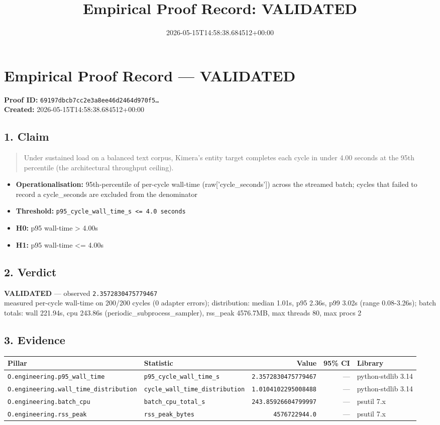 \documentclass{article}
\title{Empirical Proof Record: VALIDATED}
\date{2026-05-15T14:58:38.684512+00:00}
\begin{document}
\maketitle
\section*{Empirical Proof Record --- \textcolor{validated}{\textbf{VALIDATED}}}
\textbf{Proof ID:} \texttt{69197dbcb7cc2e3a8ee46d2464d970f5\dots}\\
\textbf{Created:} 2026-05-15T14:58:38.684512+00:00
\subsection*{1. Claim}
\begin{quote}Under sustained load on a balanced text corpus, Kimera's entity target completes each cycle in under 4.00 seconds at the 95th percentile (the architectural throughput ceiling).\end{quote}
\begin{itemize}
\item \textbf{Operationalisation:} 95th-percentile of per-cycle wall-time (raw['cycle\_seconds']) across the streamed batch; cycles that failed to record a cycle\_seconds are excluded from the denominator
\item \textbf{Threshold:} \texttt{p95\_cycle\_wall\_time\_s <= 4.0 seconds}
\item \textbf{H0:} p95 wall-time > 4.00s
\item \textbf{H1:} p95 wall-time <= 4.00s
\end{itemize}
\subsection*{2. Verdict}
\textcolor{validated}{\textbf{VALIDATED}} --- observed \texttt{2.3572830475779467}\\
measured per-cycle wall-time on 200/200 cycles (0 adapter errors); distribution: median 1.01s, p95 2.36s, p99 3.02s (range 0.08-3.26s); batch totals: wall 221.94s, cpu 243.86s (periodic\_subprocess\_sampler), rss\_peak 4576.7MB, max threads 80, max procs 2
\subsection*{3. Evidence}
\begin{tabular}{llrrl}\toprule
\textbf{Pillar} & \textbf{Statistic} & \textbf{Value} & \textbf{95\% CI} & \textbf{Library} \\\midrule
\texttt{O.engineering.p95\_wall\_time} & \texttt{p95\_cycle\_wall\_time\_s} & \texttt{2.3572830475779467} & --- & python-stdlib 3.14 \\
\texttt{O.engineering.wall\_time\_distribution} & \texttt{cycle\_wall\_time\_distribution} & \texttt{1.0104102295008488} & --- & python-stdlib 3.14 \\
\texttt{O.engineering.batch\_cpu} & \texttt{batch\_cpu\_total\_s} & \texttt{243.85926604799997} & --- & psutil 7.x \\
\texttt{O.engineering.rss\_peak} & \texttt{rss\_peak\_bytes} & \texttt{4576722944.0} & --- & psutil 7.x \\
\bottomrule\end{tabular}
\end{document}
